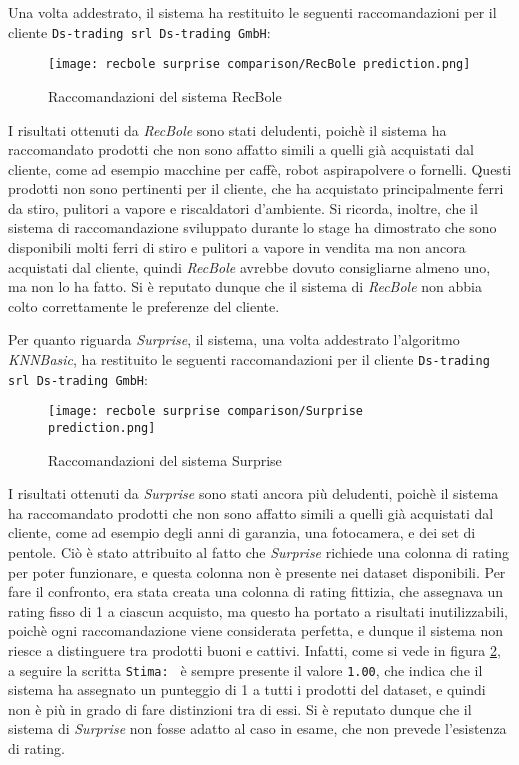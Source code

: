 Una volta addestrato, il sistema ha restituito le seguenti raccomandazioni per il cliente \texttt{Ds-trading srl Ds-trading GmbH}:

\begin{figure}[h]
    \centering
    \texttt{[image: recbole surprise comparison/RecBole prediction.png]}
    \caption{Raccomandazioni del sistema RecBole}
    \label{fig:recbole-recommendations}
\end{figure}

I risultati ottenuti da \emph{RecBole} sono stati deludenti, poichè il sistema ha raccomandato prodotti che non sono affatto simili a quelli già acquistati dal cliente, come ad esempio macchine per caffè, robot aspirapolvere o fornelli. Questi prodotti non sono pertinenti per il cliente, che ha acquistato principalmente ferri da stiro, pulitori a vapore e riscaldatori d'ambiente. Si ricorda, inoltre, che il sistema di raccomandazione sviluppato durante lo stage ha dimostrato che sono disponibili molti ferri di stiro e pulitori a vapore in vendita ma non ancora acquistati dal cliente, quindi \emph{RecBole} avrebbe dovuto consigliarne almeno uno, ma non lo ha fatto. Si è reputato dunque che il sistema di \emph{RecBole} non abbia colto correttamente le preferenze del cliente.

Per quanto riguarda \emph{Surprise}, il sistema, una volta addestrato l'algoritmo \emph{KNNBasic}, ha restituito le seguenti raccomandazioni per il cliente \texttt{Ds-trading srl Ds-trading GmbH}:

\begin{figure}[h]
    \centering
    \texttt{[image: recbole surprise comparison/Surprise prediction.png]}
    \caption{Raccomandazioni del sistema Surprise}
    \label{fig:surprise-recommendations}
\end{figure}

I risultati ottenuti da \emph{Surprise} sono stati ancora più deludenti, poichè il sistema ha raccomandato prodotti che non sono affatto simili a quelli già acquistati dal cliente, come ad esempio degli anni di garanzia, una fotocamera, e dei set di pentole. Ciò è stato attribuito al fatto che \emph{Surprise} richiede una colonna di rating per poter funzionare, e questa colonna non è presente nei dataset disponibili. Per fare il confronto, era stata creata una colonna di rating fittizia, che assegnava un rating fisso di 1 a ciascun acquisto, ma questo ha portato a risultati inutilizzabili, poichè ogni raccomandazione viene considerata perfetta, e dunque il sistema non riesce a distinguere tra prodotti buoni e cattivi. Infatti, come si vede in figura \ref{fig:surprise-recommendations}, a seguire la scritta \texttt{Stima: } è sempre presente il valore \texttt{1.00}, che indica che il sistema ha assegnato un punteggio di 1 a tutti i prodotti del dataset, e quindi non è più in grado di fare distinzioni tra di essi. Si è reputato dunque che il sistema di \emph{Surprise} non fosse adatto al caso in esame, che non prevede l'esistenza di rating.

